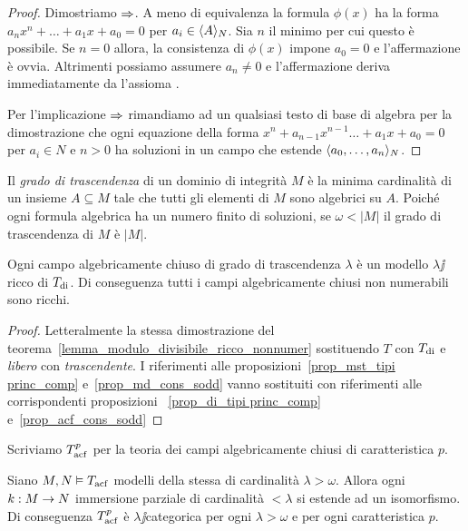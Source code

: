 \begin{proof}
Dimostriamo $\IMP$. A meno di equivalenza la formula $\phi(x)$ ha la forma $a_nx^n + \dots + a_1 x + a_0=0$ per $a_i\in\<A\>_N$. Sia $n$ il minimo per cui questo \`e possibile. Se $n=0$ allora, la consistenza di $\phi(x)$ impone $a_0=0$ e l'affermazione \`e ovvia. Altrimenti possiamo assumere $a_n\neq0$ e l'affermazione deriva immediatamente da l'assioma . 

Per l'implicazione $\IMP$ rimandiamo ad un qualsiasi testo di base di algebra per la dimostrazione che ogni equazione della forma $x^n + a_{n-1}x^{n-1} \dots + a_1 x + a_0=0$ per $a_i\in N$ e $n>0$ ha soluzioni in un campo che estende $\<a_0,\dots,a_n\>_N$.
\end{proof}

Il \emph{grado di trascendenza\/} di un dominio di integrit\`a $M$ \`e la minima cardinalit\`a di un insieme $A\subseteq M$ tale che tutti gli elementi di $M$ sono algebrici su $A$. Poich\'e ogni formula algebrica ha un numero finito di soluzioni, se $\omega<|M|$ il grado di trascendenza di $M$ \`e $|M|$. 


\begin{theorem}\label{thm_acf_ricco_nonnumer}
Ogni campo algebricamente chiuso di grado di trascendenza  $\lambda$ \`e un modello $\lambda\jj$ricco di $T_{\rm di}$. Di conseguenza tutti i campi  algebricamente chiusi non numerabili sono ricchi.
\end{theorem}


\begin{proof}
Letteralmente la stessa dimostrazione del teorema~\ref{lemma_modulo_divisibile_ricco_nonnumer} sostituendo $T$ con $T_{\rm di}$ e \textit{libero\/} con \textit{trascendente\/}. I riferimenti alle proposizioni~\ref{prop_mst_tipi princ_comp} e~\ref{prop_md_cons_sodd} vanno sostituiti con riferimenti alle corrispondenti proposizioni ~\ref{prop_di_tipi princ_comp} e~\ref{prop_acf_cons_sodd}
\end{proof}

Scriviamo $T^p_{\rm acf}$ per la teoria dei campi algebricamente chiusi di caratteristica $p$. 


\begin{corollary}\label{thm_acfUltraOmog}
Siano $M,N\models T_{\rm acf}$ modelli della stessa di cardinalit\`a $\lambda>\omega$. Allora ogni $k:M\imp N$ immersione parziale di cardinalit\`a $<\lambda$ si estende ad un isomorfismo. Di conseguenza $T^p_{\rm acf}$ \`e $\lambda\jj$categorica per ogni $\lambda>\omega$ e per ogni caratteristica $p$.
\end{corollary}

